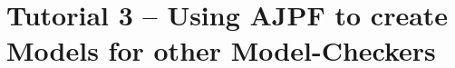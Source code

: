 \section{Tutorial 3 -- Using AJPF to create Models for other Model-Checkers}

{
  \let\section\subsection
  \let\subsection\subsubsection
  \let\subsubsection\paragraph


}

